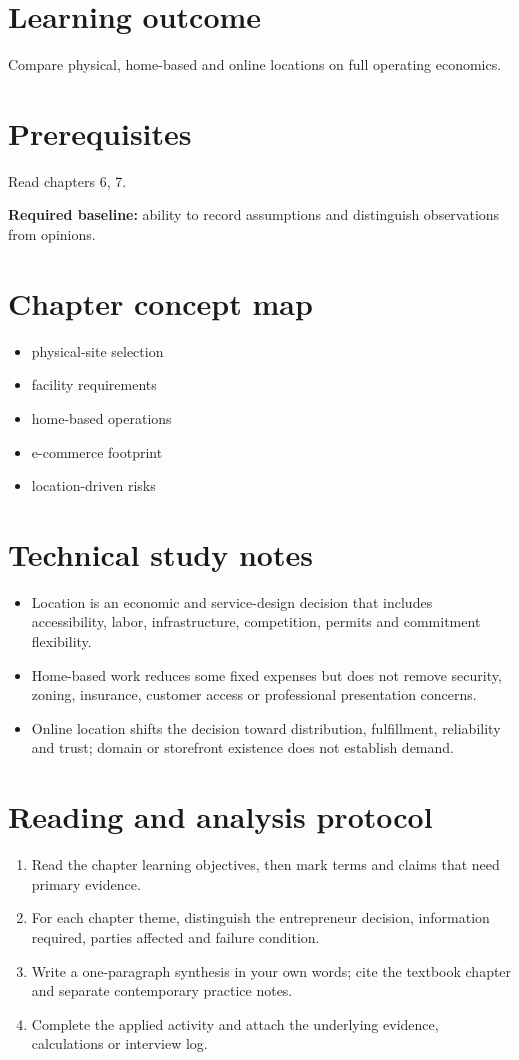 \documentclass[11pt,letterpaper]{article}
\begin{document}
\SuiteOpen
\section{Learning outcome}
Compare physical, home-based and online locations on full operating economics.
\section{Prerequisites}
Read chapters 6, 7.\par\textbf{Required baseline:} ability to record assumptions and distinguish observations from opinions.
\section{Chapter concept map}
\begin{itemize}[leftmargin=*,itemsep=3pt]
\item physical-site selection
\item facility requirements
\item home-based operations
\item e-commerce footprint
\item location-driven risks
\end{itemize}

\section{Technical study notes}
\begin{itemize}[leftmargin=*,itemsep=3pt]
\item Location is an economic and service-design decision that includes accessibility, labor, infrastructure, competition, permits and commitment flexibility.
\item Home-based work reduces some fixed expenses but does not remove security, zoning, insurance, customer access or professional presentation concerns.
\item Online location shifts the decision toward distribution, fulfillment, reliability and trust; domain or storefront existence does not establish demand.
\end{itemize}

\section{Reading and analysis protocol}
\begin{enumerate}[leftmargin=*,itemsep=5pt]
\item Read the chapter learning objectives, then mark terms and claims that need primary evidence.
\item For each chapter theme, distinguish the entrepreneur decision, information required, parties affected and failure condition.
\item Write a one-paragraph synthesis in your own words; cite the textbook chapter and separate contemporary practice notes.
\item Complete the applied activity and attach the underlying evidence, calculations or interview log.
\end{enumerate}
\end{document}

